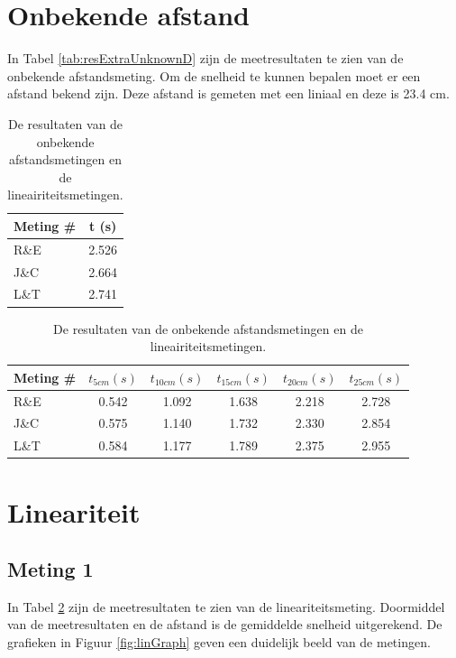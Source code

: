 \documentclass{report}
\begin{document}
\section{Onbekende afstand}

In Tabel \ref{tab:resExtraUnknownD} zijn de meetresultaten te zien van de onbekende afstandsmeting. Om de snelheid te kunnen bepalen moet er een afstand bekend zijn. Deze afstand is gemeten met een liniaal en deze is 23.4 cm.

\begin{table}
	\centering
	\caption{De resultaten van de onbekende afstandsmetingen en de lineairiteitsmetingen.}

	\begin{subtable}[b]{0.33\linewidth}
		\centering
		\label{tab:resExtraUnknownD}
		\begin{tabular}{| l| c|}
		\hline
		  Meting \#  & t (s)\\
		\hline
		  R\&E & 2.526 \\
		\hline
		J\&C & 2.664 \\
		\hline
		L\&T & 2.741 \\
		\hline
		 \end{tabular}
	\end{subtable}
	\begin{subtable}[b]{0.66\linewidth}
		\centering
		\label{tab:resExtraLin}
		\begin{tabular}{| l| c| c| c| c| c|}
		\hline
		  Meting \# & $t_{5cm} (s)$ & $t_{10cm} (s)$ & $t_{15cm} (s)$ & $t_{20cm} (s)$ & $t_{25cm} (s)$\\
		\hline
		  R\&E & 0.542 & 1.092 & 1.638 & 2.218 & 2.728 \\
		\hline
		J\&C & 0.575 & 1.140 & 1.732 & 2.330 & 2.854 \\
		\hline
		L\&T & 0.584 & 1.177 & 1.789 & 2.375 & 2.955 \\
		\hline
		 \end{tabular}
	\end{subtable}
\end{table}

\section{Lineariteit}
\subsection*{Meting 1}
In Tabel \ref{tab:resExtraLin} zijn de meetresultaten te zien van de lineariteitsmeting. Doormiddel van de meetresultaten en de afstand is de gemiddelde snelheid uitgerekend. De grafieken in Figuur \ref{fig:linGraph} geven een duidelijk beeld van de metingen.
\end{document}

